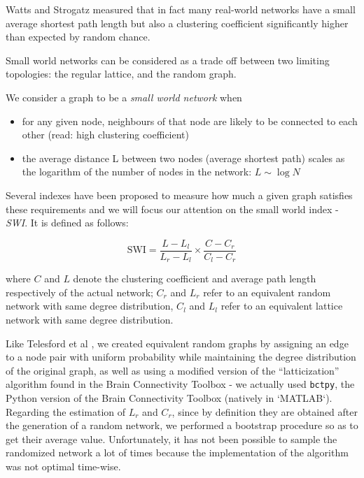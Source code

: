 \documentclass[%
 aip,
 jmp,%
 amsmath,amssymb,
 reprint,%
]{revtex4-1}
\begin{document}
Watts and Strogatz measured that in fact many real-world networks have a small average shortest path length but also a clustering coefficient significantly higher than expected by random chance.

Small world networks can be considered as a trade off between two limiting topologies\cite{smallBarth}: the regular lattice, and the random graph.

We consider a graph to be a \textit{small world network} when

\begin{itemize}
	\item for any given node, neighbours of that node are likely to be connected to each other (read: high clustering coefficient)
	\item the average distance L between two nodes (average shortest path) scales as the logarithm of the number of nodes in the network: $L \sim \log N$
	
\end{itemize}

Several indexes have been proposed to measure how much a given graph satisfies these requirements\cite{smallWiki} and we will focus our attention on the small world index - \textit{SWI}. It is defined\cite{swi} as follows:

\begin{equation}
	\text{SWI} = \frac{L-L_l}{L_r-L_l} \times \frac{C-C_r}{C_l-C_r}
\end{equation}

where $C$ and $ L $ denote the clustering coefficient and average path length respectively of the actual network;  $C_r$ and $ L_r $ refer to an equivalent random network with same degree distribution, $C_l$ and $ L_l $ refer to an equivalent lattice network with same degree distribution.

Like Telesford et al \cite{smallTelesford}, we created equivalent random graphs by assigning an edge to a node pair with uniform probability while maintaining the degree distribution of the original graph\cite{maslov}, as well as using a modified version of the “latticization” algorithm\cite{sporns} found in the Brain Connectivity Toolbox\cite{bct} - we actually used \verb|bctpy|\cite{bctpy}, the Python version of the Brain Connectivity Toolbox (natively in `MATLAB`).\\

Regarding the estimation of $L_r$ and $ C_r $, since by definition they are obtained after the generation of a random network, we performed a bootstrap procedure so as to get their average value. Unfortunately, it has not been possible to sample the randomized network a lot of times because the implementation of the algorithm was not optimal time-wise. \\
\end{document}
